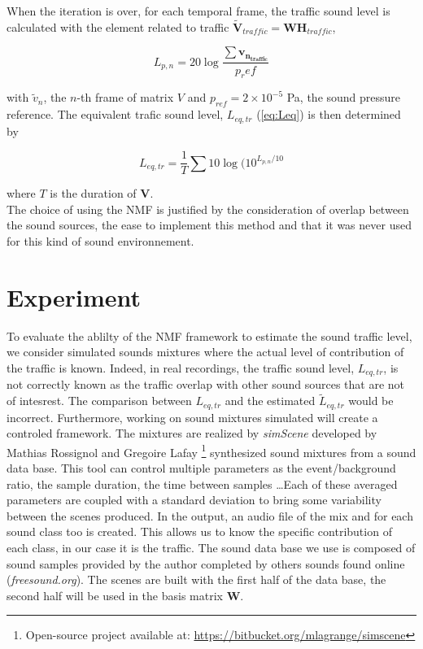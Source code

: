 \documentclass{article}
\begin{document}
\begin{sloppy}
When the iteration is over, for each temporal frame, the traffic sound level is calculated with the element related to traffic $\mathbf{\tilde{V}}_{traffic} = \mathbf{WH}_{traffic}$,

\begin{equation}
L_{p,n} = 20\log\frac{\sum\mathbf{v_{n_{traffic}}}}{p_ref}
\end{equation}

with $\tilde{v}_n$, the $n$-th frame of matrix $V$ and $ p_{ref} = 2\times 10^{-5}$ Pa, the sound pressure reference. The equivalent trafic sound level, $L_{eq,tr}$ (\ref{eq:Leq}) is then determined by

\begin{equation}
L_{eq,tr} = \frac{1}{T} \sum 10\log (10^{L_{p,n}/10}
\end{equation}

where $T$ is the duration of $\mathbf{V}$.\\

The choice of using the NMF is justified by the consideration of overlap between the sound sources, the ease to implement this method and that it was never used for this kind of sound environnement.

\section{Experiment}

To evaluate the ablilty of the NMF framework to estimate the sound traffic level, we consider simulated sounds mixtures where the actual level of contribution of the traffic is known. Indeed, in real recordings, the traffic sound level, $L_{eq,tr}$, is not correctly known as the traffic overlap with other sound sources that are not of intesrest. The comparison between $L_{eq,tr}$ and the estimated $\tilde{L}_{eq,tr}$ would be incorrect. Furthermore, working on sound mixtures simulated will create a controled framework.
The mixtures are realized by \textit{simScene} developed by Mathias Rossignol and Gregoire Lafay \cite{simScene}\footnote{Open-source project available at: \url{https://bitbucket.org/mlagrange/simscene}} synthesized sound mixtures from a sound data base. This tool can control multiple parameters as the event/background ratio, the sample duration, the time between samples \dots Each of these averaged parameters are coupled with a standard deviation to bring some variability between the scenes produced. In the output, an audio file of the mix and for each sound class too is created. This allows us to know the specific contribution of each class, in our case it is the traffic. The sound data base we use is composed of sound samples provided by the author completed by others sounds found online (\textit{freesound.org}). The scenes are built with the first half of the data base, the second half will be used in the basis matrix $\mathbf{W}$.\\


\end{sloppy}
\end{document}

